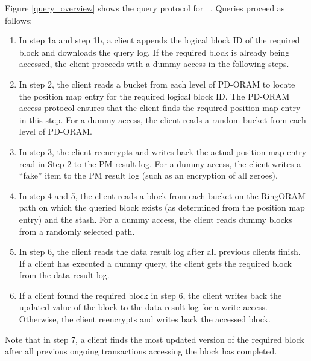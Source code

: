 Figure \ref{query_overview} shows the query protocol for \sysname~. Queries proceed as follows: 
\begin{enumerate}
 \item In step 1a and step 1b, a client appends the logical block ID of the required block and downloads the query log. If the required block 
 is already being accessed, the client proceeds with a dummy access in the following steps.
 \item In step 2, the client reads a bucket from each level of PD-ORAM to locate the position map entry for the required logical block ID. The PD-ORAM access protocol 
 ensures that the client finds the required position map entry in this step. For a dummy access, the client reads a random bucket from each level of PD-ORAM.
 \item In step 3, the client reencrypts and writes back the actual position map entry read in Step 2 to the PM result log. For a dummy access, the client writes a ``fake'' 
 item to the PM result log (such as an encryption of all zeroes).
 \item In step 4 and 5, the client reads a block from each bucket on the RingORAM path 
 on which the queried block exists (as determined from the position map entry) and the stash. For a dummy access, 
 the client reads dummy blocks from a randomly selected path.
 \item In step 6, the client reads the data result log after all previous clients finish. If a client has executed 
 a dummy query, the client gets the required block from the data result log. 
 \item If a client found the required block in step 6, the client writes back the updated value of the block to the 
 data result log for a write access. Otherwise, the client reencrypts and writes back the accessed block.
\end{enumerate}

Note that in step 7, a client finds the most updated version of the 
required block after all previous ongoing transactions accessing the block has completed. 


